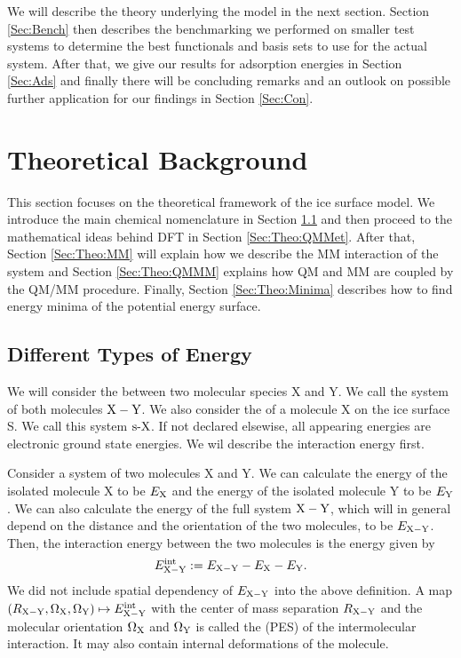 \documentclass[8.5pt,twoside,twocolumn]{article}
\newcommand\eint{\enmat{E^{\te{int}}}}
\theoremstyle{standard}
\begin{document}
We will describe the theory underlying the model in the next section. Section \ref{Sec:Bench} then describes the
benchmarking we performed on smaller test systems to determine the best functionals and basis sets to use for 
the actual system. After that, we give our results for adsorption energies in Section \ref{Sec:Ads} and finally 
there will be concluding remarks and an outlook on possible further application for our findings in Section 
\ref{Sec:Con}.

\section{Theoretical Background}
\label{Sec:Theo}
This section focuses on the theoretical framework of the ice surface model. We introduce the main chemical
nomenclature in Section \ref{Sec:Theo:Interaction} and then proceed to the mathematical ideas behind
DFT in Section \ref{Sec:Theo:QMMet}. After that, Section \ref{Sec:Theo:MM} will explain how we describe
the MM interaction of the system and Section \ref{Sec:Theo:QMMM} explains how QM and MM are coupled
by the QM/MM procedure. Finally, Section \ref{Sec:Theo:Minima} describes how to find energy minima
of the potential energy surface.

\newcommand\X{\enmat{\te X}}
\newcommand\Y{\enmat{\te Y}}
\newcommand\XY{{\enmat{\X - \Y}}}
\renewcommand\S{\enmat{\te S}}
\newcommand\sX{\enmat{\te {s-X}}}
\newcommand\A{\enmat{\te A}}
\subsection{Different Types of Energy}
\label{Sec:Theo:Interaction}
We will consider the  between two molecular species X and Y. We call
the system of both molecules $\XY$. We also consider the  of a molecule X on
the ice surface S. We call this system $\sX$. If not declared elsewise, all appearing energies are
electronic ground state energies. We wil describe the interaction energy first.

Consider a system of two molecules X and Y. We can calculate the energy of the isolated molecule X to
be $E_{\text X}$ and the energy of the isolated molecule Y to be $E_{\text Y}$. We can also calculate the 
energy of the full system $\XY$, which will in general depend on the distance and the orientation
of the two molecules, to be $E_{\XY}$. Then, the interaction energy between the two molecules
is the energy given by
\begin{equation}
 \eint_{\XY} := E_{\XY} - E_\X - E_\Y.
 \label{Theo:InteractionEnergy}
\end{equation}
We did not include spatial dependency of $E_{\XY}$ into the above definition. A map
\mbox{$(R_\XY, \Om_\X, \Om_\Y) \mapsto \eint_\XY$} with the center of mass separation
$R_\XY$ and the molecular orientation $\Om_\X$ and $\Om_\Y$ is called the  (PES)
of the intermolecular interaction. It may also contain internal deformations of the molecule.
\end{document}
